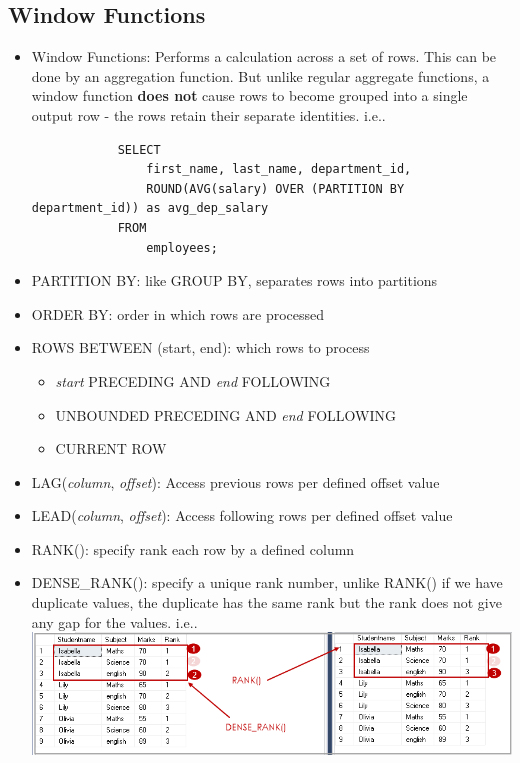 \documentclass{article}
\begin{document}
\begin{multicols*}{2}
    \section{Window Functions}
    \renewcommand\labelitemi{{\boldmath$\cdot$}}
    \begin{itemize}[noitemsep]
        \item Window Functions: Performs a calculation across a set of rows. This 
        can be done by an aggregation function. But unlike regular aggregate 
        functions, a window function \textbf{does not} cause rows to become grouped 
        into a single output row - the rows retain their separate identities. i.e.. 
        \begin{lstlisting}
            SELECT 
                first_name, last_name, department_id,
                ROUND(AVG(salary) OVER (PARTITION BY department_id)) as avg_dep_salary
            FROM 
                employees;
        \end{lstlisting}
        \item PARTITION BY: like GROUP BY, separates rows into partitions
        \item ORDER BY: order in which rows are processed
        \item ROWS BETWEEN (start, end): which rows to process 
        \begin{itemize}
            \item \emph{start} PRECEDING AND \emph{end} FOLLOWING
            \item UNBOUNDED PRECEDING AND \emph{end} FOLLOWING
            \item CURRENT ROW
        \end{itemize}
        \item LAG(\emph{column}, \emph{offset}): Access previous rows per defined offset value
        \item LEAD(\emph{column}, \emph{offset}): Access following rows per defined offset value
        \item RANK(): specify rank each row by a defined column
        \item DENSE\_RANK(): specify a unique rank number, unlike RANK() if we have 
        duplicate values, the duplicate has the same rank but the rank does not 
        give any gap for the values. i.e..
        \includegraphics[width=\linewidth]{rank_vs_denserank}

\end{itemize}
\end{multicols*}
\end{document}
